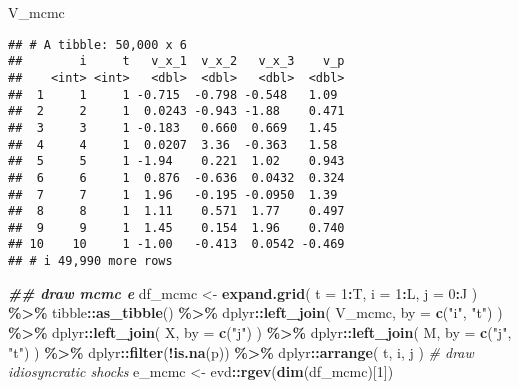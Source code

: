 \documentclass[
]{book}
\newenvironment{Shaded}{\begin{snugshade}}{\end{snugshade}}
\newcommand{\AttributeTok}[1]{\textcolor[rgb]{0.13,0.29,0.53}{#1}}
\newcommand{\CommentTok}[1]{\textcolor[rgb]{0.56,0.35,0.01}{\textit{#1}}}
\newcommand{\DecValTok}[1]{\textcolor[rgb]{0.00,0.00,0.81}{#1}}
\newcommand{\DocumentationTok}[1]{\textcolor[rgb]{0.56,0.35,0.01}{\textbf{\textit{#1}}}}
\newcommand{\FunctionTok}[1]{\textcolor[rgb]{0.13,0.29,0.53}{\textbf{#1}}}
\newcommand{\NormalTok}[1]{#1}
\newcommand{\OtherTok}[1]{\textcolor[rgb]{0.56,0.35,0.01}{#1}}
\newcommand{\SpecialCharTok}[1]{\textcolor[rgb]{0.81,0.36,0.00}{\textbf{#1}}}
\newcommand{\StringTok}[1]{\textcolor[rgb]{0.31,0.60,0.02}{#1}}
\begin{document}
\begin{Shaded}
\begin{Highlighting}[]
\NormalTok{V\_mcmc}
\end{Highlighting}
\end{Shaded}

\begin{verbatim}
## # A tibble: 50,000 x 6
##        i     t   v_x_1  v_x_2   v_x_3    v_p
##    <int> <int>   <dbl>  <dbl>   <dbl>  <dbl>
##  1     1     1 -0.715  -0.798 -0.548   1.09 
##  2     2     1  0.0243 -0.943 -1.88    0.471
##  3     3     1 -0.183   0.660  0.669   1.45 
##  4     4     1  0.0207  3.36  -0.363   1.58 
##  5     5     1 -1.94    0.221  1.02    0.943
##  6     6     1  0.876  -0.636  0.0432  0.324
##  7     7     1  1.96   -0.195 -0.0950  1.39 
##  8     8     1  1.11    0.571  1.77    0.497
##  9     9     1  1.45    0.154  1.96    0.740
## 10    10     1 -1.00   -0.413  0.0542 -0.469
## # i 49,990 more rows
\end{verbatim}

\begin{Shaded}
\begin{Highlighting}[]
\DocumentationTok{\#\# draw mcmc e}
\NormalTok{df\_mcmc }\OtherTok{\textless{}{-}} 
  \FunctionTok{expand.grid}\NormalTok{(}
    \AttributeTok{t =} \DecValTok{1}\SpecialCharTok{:}\NormalTok{T, }
    \AttributeTok{i =} \DecValTok{1}\SpecialCharTok{:}\NormalTok{L, }
    \AttributeTok{j =} \DecValTok{0}\SpecialCharTok{:}\NormalTok{J}
\NormalTok{    ) }\SpecialCharTok{\%\textgreater{}\%}
\NormalTok{  tibble}\SpecialCharTok{::}\FunctionTok{as\_tibble}\NormalTok{() }\SpecialCharTok{\%\textgreater{}\%}
\NormalTok{  dplyr}\SpecialCharTok{::}\FunctionTok{left\_join}\NormalTok{(}
\NormalTok{    V\_mcmc, }
    \AttributeTok{by =} \FunctionTok{c}\NormalTok{(}\StringTok{"i"}\NormalTok{, }\StringTok{"t"}\NormalTok{)}
\NormalTok{    ) }\SpecialCharTok{\%\textgreater{}\%}
\NormalTok{  dplyr}\SpecialCharTok{::}\FunctionTok{left\_join}\NormalTok{(}
\NormalTok{    X, }
    \AttributeTok{by =} \FunctionTok{c}\NormalTok{(}\StringTok{"j"}\NormalTok{)}
\NormalTok{    ) }\SpecialCharTok{\%\textgreater{}\%}
\NormalTok{  dplyr}\SpecialCharTok{::}\FunctionTok{left\_join}\NormalTok{(}
\NormalTok{    M, }
    \AttributeTok{by =} \FunctionTok{c}\NormalTok{(}\StringTok{"j"}\NormalTok{, }\StringTok{"t"}\NormalTok{)}
\NormalTok{    ) }\SpecialCharTok{\%\textgreater{}\%}
\NormalTok{  dplyr}\SpecialCharTok{::}\FunctionTok{filter}\NormalTok{(}\SpecialCharTok{!}\FunctionTok{is.na}\NormalTok{(p)) }\SpecialCharTok{\%\textgreater{}\%}
\NormalTok{  dplyr}\SpecialCharTok{::}\FunctionTok{arrange}\NormalTok{(}
\NormalTok{    t, }
\NormalTok{    i, }
\NormalTok{    j}
\NormalTok{    )}
\CommentTok{\# draw idiosyncratic shocks}
\NormalTok{e\_mcmc }\OtherTok{\textless{}{-}}\NormalTok{ evd}\SpecialCharTok{::}\FunctionTok{rgev}\NormalTok{(}\FunctionTok{dim}\NormalTok{(df\_mcmc)[}\DecValTok{1}\NormalTok{])}
\end{Highlighting}
\end{Shaded}
\end{document}
